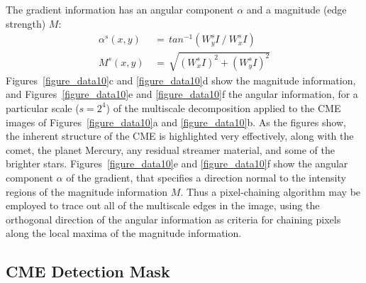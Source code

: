 \documentclass[preprint2]{aastex}
\begin{document}
The gradient information has an angular component $\alpha$ and a magnitude (edge strength) $M$:
\begin{eqnarray}
\alpha^s(x,y) \, &= \, tan^{-1}\left( W_{y}^s I~/~W_{x}^s I \right) \\
M^s(x,y) \, &= \, \sqrt{ ( W_{x}^s I ) ^2 + ( W_{y}^s I ) ^2 }
\end{eqnarray}
Figures~\ref{figure_data10}c and \ref{figure_data10}d show the magnitude information, and Figures~\ref{figure_data10}e and \ref{figure_data10}f the angular information, for a particular scale ($s=2^{4}$) of the multiscale decomposition applied to the CME images of Figures~\ref{figure_data10}a and \ref{figure_data10}b. As the figures show, the inherent structure of the CME is highlighted very effectively, along with the comet, the planet Mercury, any residual streamer material, and some of the brighter stars. Figures~\ref{figure_data10}e and \ref{figure_data10}f show the angular component $\alpha$ of the gradient, that specifies a direction normal to the intensity regions of the magnitude information $M$. Thus a pixel-chaining algorithm may be employed to trace out all of the multiscale edges in the image, using the orthogonal direction of the angular information as criteria for chaining pixels along the local maxima of the magnitude information.


\subsection{CME Detection Mask}
\label{sect_detectionmask}

\end{document}
